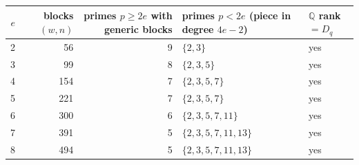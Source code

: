 \begin{tabular}{@{}rrrll@{}}
\toprule
$e$ & blocks $(w,n)$ & primes $p\ge2e$ with generic blocks & primes $p<2e$ (piece in degree $4e-2$) & $\mathbb{Q}$ rank $=D_q$\\
\midrule
2 & 56 & 9 & $\{2,3\}$ & yes\\
3 & 99 & 8 & $\{2,3,5\}$ & yes\\
4 & 154 & 7 & $\{2,3,5,7\}$ & yes\\
5 & 221 & 7 & $\{2,3,5,7\}$ & yes\\
6 & 300 & 6 & $\{2,3,5,7,11\}$ & yes\\
7 & 391 & 5 & $\{2,3,5,7,11,13\}$ & yes\\
8 & 494 & 5 & $\{2,3,5,7,11,13\}$ & yes\\
\bottomrule
\end{tabular}
